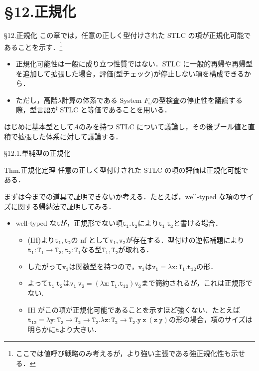 \documentclass[9pt]{beamer}
\begin{document}
\section{\S12.正規化}
\begin{frame}{\S12.正規化}
この章では，任意の正しく型付けされた STLC の項が正規化可能であることを示す．\footnote{ここでは値呼び戦略のみ考えるが，より強い主張である強正規化性も示せる．}
\begin{itemize}
\item 正規化可能性は一般に成り立つ性質ではない．STLC に一般的再帰や再帰型を追加して拡張した場合，評価(型チェック)が停止しない項を構成できるから．
\item ただし，高階$\lambda$計算の体系である System $F_{\omega}$の型検査の停止性を議論する際，型言語が STLC と等価であることを用いる．
\end{itemize}
はじめに基本型として$A$のみを持つ STLC について議論し，その後ブール値と直積で拡張した体系に対して議論する．
\end{frame}
\begin{frame}{\S12.1.単純型の正規化}
\begin{alertblock}{Thm.正規化定理}
任意の正しく型付けされた STLC の項の評価は正規化可能である．
\end{alertblock}
まずは今までの道具で証明できないか考える．たとえば，well-typed な項のサイズに関する帰納法で証明してみる．\begin{itemize}
\item well-typed な$\mathtt{t}$が，正規形でない項$\mathtt{t_{1}.t_{2}}$により$\mathtt{t_{1}\ t_{2}}$と書ける場合．
\begin{itemize}
\item (IH)より$\mathtt{t_{1},t_{2}}$の nf として$\mathtt{v_{1},v_{2}}$が存在する．型付けの逆転補題により$\mathtt{t_{1}:T_{1}\to T_{2}, t_{2}:T_{1}}$なる型$\mathtt{T_{1},T_{2}}$が取れる．
\item したがって$\mathtt{v_{1}}$は関数型を持つので，$\mathtt{v_{1}}$は$\mathtt{v_{1}=\lambda x:T_{1}.t_{12}}$の形．
\item よって$\mathtt{t_{1}\ t_{2}}$は$\mathtt{v_{1}\ v_{2} = (\lambda x:T_{1}.t_{12})v_{2}}$まで簡約されるが，これは正規形でない.
\item IH がこの項が正規化可能であることを示すほど強くない．たとえば$\mathtt{t_{12} = \lambda y:T_{2}\to T_{2}\to T_{2}. \lambda z:T_{2}\to T_{2}. y\ x\ (z\ y)}$の形の場合，項のサイズは明らかに$\mathtt{t}$より大きい．
\end{itemize}
\end{itemize}
\end{frame}
\end{document}

